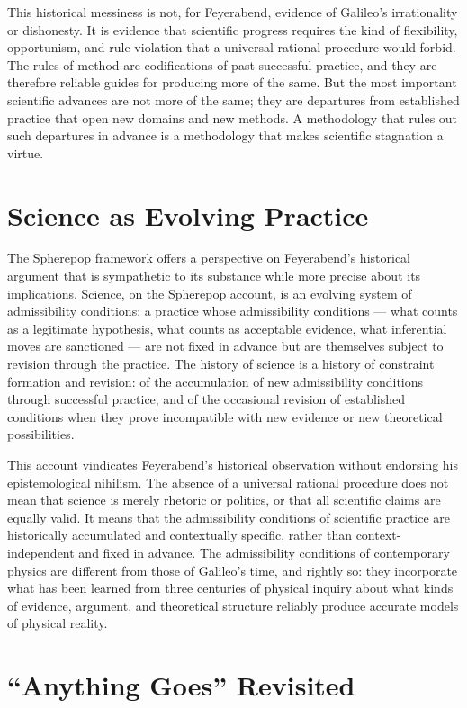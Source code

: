 \documentclass[12pt,openany]{book}
\theoremstyle{plain}
\theoremstyle{definition}
\theoremstyle{remark}
\begin{document}
This historical messiness is not, for Feyerabend, evidence of Galileo's irrationality or dishonesty. It is evidence that scientific progress requires the kind of flexibility, opportunism, and rule-violation that a universal rational procedure would forbid. The rules of method are codifications of past successful practice, and they are therefore reliable guides for producing more of the same. But the most important scientific advances are not more of the same; they are departures from established practice that open new domains and new methods. A methodology that rules out such departures in advance is a methodology that makes scientific stagnation a virtue.

\section{Science as Evolving Practice}

The Spherepop framework offers a perspective on Feyerabend's historical argument that is sympathetic to its substance while more precise about its implications. Science, on the Spherepop account, is an evolving system of admissibility conditions: a practice whose admissibility conditions — what counts as a legitimate hypothesis, what counts as acceptable evidence, what inferential moves are sanctioned — are not fixed in advance but are themselves subject to revision through the practice. The history of science is a history of constraint formation and revision: of the accumulation of new admissibility conditions through successful practice, and of the occasional revision of established conditions when they prove incompatible with new evidence or new theoretical possibilities.

This account vindicates Feyerabend's historical observation without endorsing his epistemological nihilism. The absence of a universal rational procedure does not mean that science is merely rhetoric or politics, or that all scientific claims are equally valid. It means that the admissibility conditions of scientific practice are historically accumulated and contextually specific, rather than context-independent and fixed in advance. The admissibility conditions of contemporary physics are different from those of Galileo's time, and rightly so: they incorporate what has been learned from three centuries of physical inquiry about what kinds of evidence, argument, and theoretical structure reliably produce accurate models of physical reality.

\section{\enquote{Anything Goes} Revisited}
\end{document}
